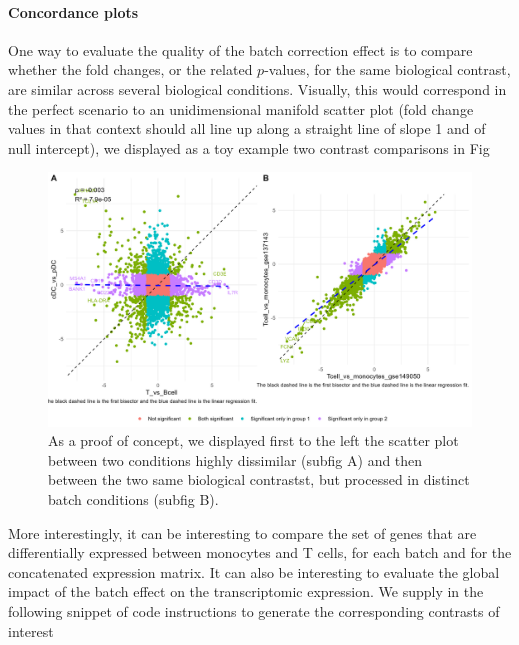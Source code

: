 \paragraph{Concordance plots}
\label{concordance-plots}

One way to evaluate the quality of the batch correction effect is to compare whether the fold changes, or the related \(p\)-values, for the same biological contrast, are similar across several biological conditions. Visually, this would correspond in the perfect scenario to an unidimensional manifold scatter plot (fold change values in that context should all line up along a straight line of slope 1 and of null intercept), we displayed as a toy example two contrast comparisons in Fig 

\begin{figure}

{\centering \includegraphics[width=0.9\linewidth]{./figures/first_concord_plot} 

}

\caption{As a proof of concept, we displayed first to the left the scatter plot between two conditions highly dissimilar (subfig A) and then between the two same biological contrastst, but processed in distinct batch conditions (subfig B).}\label{fig:concord-plot}
\end{figure}

More interestingly, it can be interesting to compare the set of genes that are differentially expressed between monocytes and T cells, for each batch and for the concatenated expression matrix. It can also be interesting to evaluate the global impact of the batch effect on the transcriptomic expression. We supply in the following snippet of code instructions to generate the corresponding contrasts of interest 

